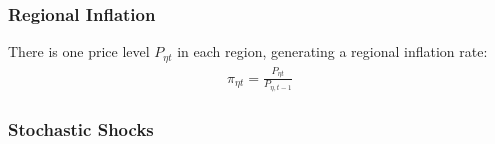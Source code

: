 \documentclass[../thesis.tex]{subfiles}
\begin{document}
\begin{comment}

where $P_t$ is the national price level, defined by:
\begin{align}
	P_{t} Y_{t} &= P_{1t} Y_{1t} + P_{2t} Y_{2t} \iff P_{t} = \frac{P_{1t} Y_{1t} + P_{2t} Y_{2t}}{Y_{t}} \label{eq_v6:reg-national-price-level}
\end{align}
	
\end{comment}

\begin{comment}
	\begin{align}
		P_{t} Y_{t} &= P_{1t} Y_{1t} + P_{2t} Y_{2t} \implies \nonumber \\
		P_{t} &= \frac{Y_{1t}}{Y_{t}} P_{1t} + \frac{Y_{2t}}{Y_{t}} P_{2t} \implies \nonumber \\
		P_{t} &= \theta_{P1} P_{1t} + (1 -\theta_{P1}) P_{2t} %
	\end{align}
	
	where $\theta_{P1}$ and $(1-\theta_{P1})$ are the price level weights of regions 1 and 2 in the national price level composition, respectively:
	\begin{align}
		\left\langle \begin{matrix} \theta_{P1} & (1-\theta_{P1}) \end{matrix} \right\rangle \coloneq \left\langle \begin{matrix} \frac{Y_{1t}}{Yt} & \frac{Y_{2t}}{Yt} \end{matrix} \right\rangle \label{eq_v6:reg-ss-P1-P2-weight-in-P}
	\end{align}
\end{comment}

\subsubsection*{Regional Inflation}

There is one price level $P_{\eta t}$ in each region, generating a regional inflation rate:
\begin{align}
	\pi_{\eta t} = \frac{P_{\eta t}}{P_{\eta, t-1}} \label{eq_v6:reg-regional-inflation}
\end{align}


\subsubsection{Stochastic Shocks}\label{sec_v6:reg-stochastic-shocks}
\end{document}
